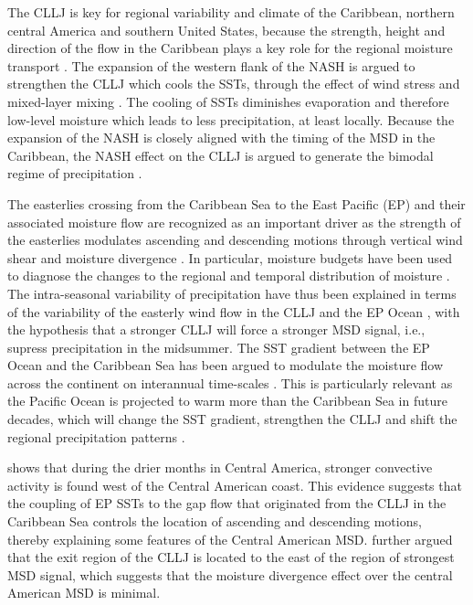  The CLLJ is key for regional variability and climate of the Caribbean, northern central America and southern United States, because the strength, height and direction of the flow in the Caribbean plays a key role for the regional moisture transport \citep{giannini2000,martinez2019,garcia2020sub}. 
 The expansion of the western flank of the NASH is argued to strengthen the CLLJ which cools the SSTs, through the effect of wind stress and mixed-layer mixing \citep{gamble2008,martinez2019}.
The cooling of SSTs diminishes evaporation and therefore low-level moisture which leads to less precipitation, at least locally. Because the expansion of the NASH is closely aligned with the timing of the MSD in the Caribbean, the NASH effect on the CLLJ is argued to generate the bimodal regime of precipitation \citep{gamble2008,martinez2019}.  
 
    
The easterlies crossing from the Caribbean Sea to the East Pacific (EP) and their associated moisture flow are recognized as an important driver as the strength of the easterlies modulates ascending and descending motions through vertical wind shear and moisture divergence \citep{herrera2015,corrales2020,zhao2020}. In particular, moisture budgets have been used to diagnose the changes to the regional and temporal distribution of moisture \citep{martinez2019}. The intra-seasonal variability of precipitation have thus been explained in terms of the variability of the easterly wind flow in the CLLJ and the EP Ocean \citep{herrera2015,martinez2019,zhao2020}, with the hypothesis that a stronger CLLJ will force a stronger MSD signal, i.e., supress precipitation in the midsummer. The SST gradient between the EP Ocean and the Caribbean Sea has been argued to modulate the moisture flow across the continent on interannual time-scales \citep{martinez2020}. This is particularly relevant as the Pacific Ocean is projected to warm more than the Caribbean Sea in future decades, which will change the SST gradient, strengthen the CLLJ and shift the regional precipitation patterns \citep{corrales2020}.
    
 \cite{herrera2015} shows that during the drier months in Central America, stronger convective activity is found west of the Central American coast.  This evidence suggests that the coupling of EP SSTs to the gap flow that originated from the CLLJ in the Caribbean Sea controls the location of ascending and descending motions, thereby explaining some features of the Central American MSD. 
\cite{herrera2015} further argued that the exit region of the CLLJ is located to the east of the region of strongest MSD signal, which suggests that the moisture divergence effect over the central American MSD is minimal. 



